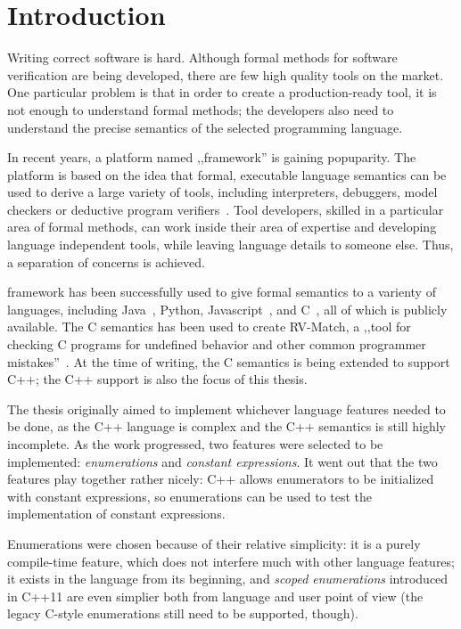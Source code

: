 \documentclass{fithesis3}
\begin{document}
\chapter{Introduction}

Writing correct software is hard.
Although formal methods for software verification are being developed, there are few high quality tools on the market. One particular problem is that in order to create a production-ready tool, it is not enough to understand formal methods; the developers also need to understand the precise semantics of the selected programming language.

In recent years, a platform named ,,\K framework'' is gaining popuparity. The platform is based on the idea that formal, executable language semantics can be used to derive a large variety of tools, including interpreters, debuggers, model checkers or deductive program verifiers~\cite{rosu-2017-marktoberdorf}. Tool developers, skilled in a particular area of formal methods, can work inside their area of expertise and developing language independent tools, while leaving language details to someone else. Thus, a separation of concerns is achieved.

\K framework has been successfully used to give formal semantics to a varienty of languages, including Java~\cite{bogdanas-rosu-2015-popl}, Python, Javascript~\cite{park-stefanescu-rosu-2015-pldi}, and C~\cite{ellison-2012-thesis}\cite{hathhorn-ellison-rosu-2015-pldi}, all of which is publicly available. The C semantics has been used to create RV-Match, a ,,tool for checking C programs for
undefined behavior and other common programmer mistakes''~\cite{guth-hathhorn-saxena-rosu-2016-cav}.  At the time of writing, the C semantics is being extended to support C++; the C++ support is also the focus of this thesis.

The thesis originally aimed to implement whichever language features needed to be done, as the C++ language is complex and the C++ semantics is still highly incomplete. As the work progressed, two features were selected to be implemented: \textit{enumerations} and \textit{constant expressions}. It went out that the two features play together rather nicely: C++ allows enumerators to be initialized with constant expressions, so enumerations can be used to test the implementation of constant expressions. 

Enumerations were chosen because of their relative simplicity: it is a purely compile-time feature, which does not interfere much with other language features; it exists in the language from its beginning, and \textit{scoped enumerations} introduced in C++11 are even simplier both from language and user point of view (the legacy C-style enumerations still need to be supported, though).
\end{document}
